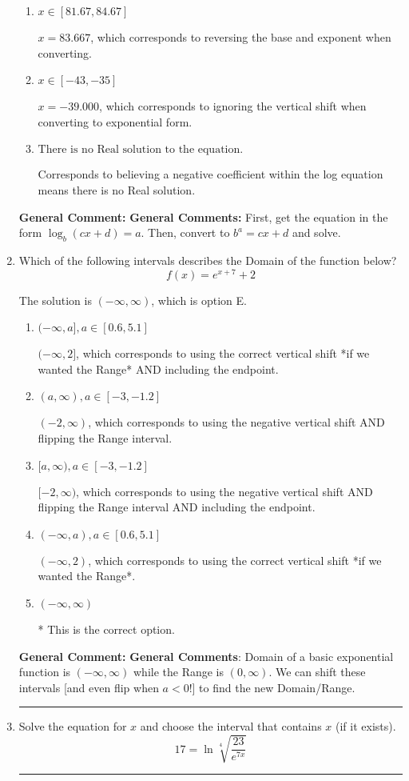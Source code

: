 \documentclass{extbook}[14pt]
\newcommand{\litem}[1]{\item #1

\rule{\textwidth}{0.4pt}}
\begin{document}
\begin{enumerate}
{\begin{enumerate}[label=\Alph*.]
$x = 78.333$, which corresponds to reversing the base and exponent when converting and reversing the value with $x$.
\item \( x \in [81.67, 84.67] \)

$x = 83.667$, which corresponds to reversing the base and exponent when converting.
\item \( x \in [-43, -35] \)

$x = -39.000$, which corresponds to ignoring the vertical shift when converting to exponential form.
\item \( \text{There is no Real solution to the equation.} \)

Corresponds to believing a negative coefficient within the log equation means there is no Real solution.
\end{enumerate}

\textbf{General Comment:} \textbf{General Comments:} First, get the equation in the form $\log_b{(cx+d)} = a$. Then, convert to $b^a = cx+d$ and solve.
}
\litem{
Which of the following intervals describes the Domain of the function below?
\[ f(x) = e^{x+7}+2 \]

The solution is \( (-\infty, \infty) \), which is option E.\begin{enumerate}[label=\Alph*.]
\item \( (-\infty, a], a \in [0.6, 5.1] \)

$(-\infty, 2]$, which corresponds to using the correct vertical shift *if we wanted the Range* AND including the endpoint.
\item \( (a, \infty), a \in [-3, -1.2] \)

$(-2, \infty)$, which corresponds to using the negative vertical shift AND flipping the Range interval.
\item \( [a, \infty), a \in [-3, -1.2] \)

$[-2, \infty)$, which corresponds to using the negative vertical shift AND flipping the Range interval AND including the endpoint.
\item \( (-\infty, a), a \in [0.6, 5.1] \)

$(-\infty, 2)$, which corresponds to using the correct vertical shift *if we wanted the Range*.
\item \( (-\infty, \infty) \)

* This is the correct option.
\end{enumerate}

\textbf{General Comment:} \textbf{General Comments}: Domain of a basic exponential function is $(-\infty, \infty)$ while the Range is $(0, \infty)$. We can shift these intervals [and even flip when $a<0$!] to find the new Domain/Range.
}
\litem{
 Solve the equation for $x$ and choose the interval that contains $x$ (if it exists).
\[  17 = \ln{\sqrt[4]{\frac{23}{e^{7x}}}} \]

}
\end{enumerate}
\end{document}
